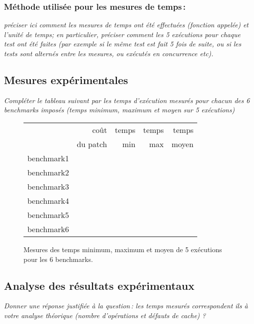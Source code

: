 \documentclass[a4paper, 10pt, english]{article}
\begin{document}
    \subsubsection{Méthode utilisée pour les mesures de temps\,: } 
      {\em préciser ici  comment les mesures de temps ont été effectuées (fonction appelée) et l'unité de temps; en particulier, 
       préciser comment les 5 exécutions pour chaque test ont été faites (par exemple si le même test est fait 5 fois de suite, ou si les tests sont alternés entre
       les mesures, ou exécutés en concurrence etc). 
      }

  \subsection{Mesures expérimentales}
    {\em Compléter le tableau suivant par les temps d'exécution mesurés pour chacun des 6 benchmarks imposés
              (temps minimum, maximum et moyen sur 5 exécutions)
    }

    \begin{figure}[h]
      \begin{center}
        \begin{tabular}{|l||r||r|r|r||}
          \hline
          \hline
            & coût         & temps     & temps   & temps \\
            & du patch     & min       & max     & moyen \\
          \hline
          \hline
            benchmark1 &      &     &     &     \\
          \hline
            benchmark2 &      &     &     &     \\
          \hline
            benchmark3 &      &     &     &     \\
          \hline
            benchmark4 &      &     &     &     \\
          \hline
            benchmark5 &      &     &     &     \\
          \hline
            benchmark6 &      &     &     &     \\
          \hline
          \hline
        \end{tabular}
        \caption{Mesures des temps minimum, maximum et moyen de 5 exécutions pour les 6 benchmarks.}
        \label{table-temps}
      \end{center}
    \end{figure}

\subsection{Analyse des résultats expérimentaux}
{\em Donner  une réponse justifiée  à la question\,: 
              les  temps mesurés correspondent ils  à votre analyse théorique (nombre d’opérations et défauts de cache) ?
}
\end{document}
